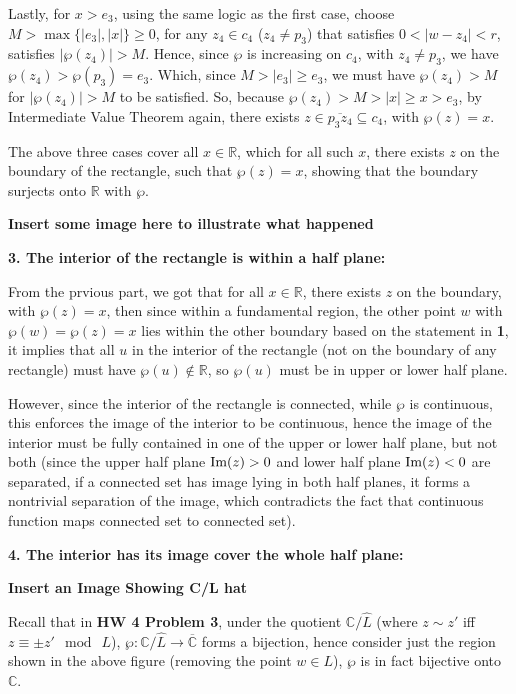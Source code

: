 \documentclass{article}
\begin{document}
\begin{itemize}
    Lastly, for $x>e_3$, using the same logic as the first case, choose $M>\max\{|e_3|,|x|\}\geq 0$, for any $z_4\in c_4$ ($z_4\neq p_3$) that satisfies $0<|w-z_4|<r$, satisfies $|\wp(z_4)|>M$. Hence, since $\wp$ is increasing on $c_4$, with $z_4\neq p_3$, we have $\wp(z_4)>\wp(p_3)=e_3$. Which, since $M>|e_3|\geq e_3$, we must have $\wp(z_4)>M$ for $|\wp(z_4)|>M$ to be satisfied.
    So, because $\wp(z_4)>M>|x|\geq x > e_3$, by Intermediate Value Theorem again, there exists $z\in \overline{p_3z_4}\subseteq c_4$, with $\wp(z)=x$. 

    The above three cases cover all $x\in\mathbb{R}$, which for all such $x$, there exists $z$ on the boundary of the rectangle, such that $\wp(z)=x$, showing that the boundary surjects onto $\mathbb{R}$ with $\wp$.

    \textbf{Insert some image here to illustrate what happened}

    \hfil

    \textbf{3. The interior of the rectangle is within a half plane:}

    From the prvious part, we got that for all $x\in \mathbb{R}$, there exists $z$ on the boundary, with $\wp(z)=x$, then since within a fundamental region, the other point $w$ with $\wp(w)=\wp(z)=x$ lies within the other boundary based on the statement in \textbf{1}, it implies that all $u$ in the interior of the rectangle (not on the boundary of any rectangle) must have $\wp(u)\notin \mathbb{R}$, so $\wp(u)$ must be in upper or lower half plane.

    However, since the interior of the rectangle is connected, while $\wp$ is continuous, this enforces the image of the interior to be continuous, hence the image of the interior must be fully contained in one of the upper or lower half plane, but not both (since the upper half plane $\textmd{Im}(z)>0$ and lower half plane $\textmd{Im}(z)<0$ are separated, if a connected set has image lying in both half planes, it forms a nontrivial separation of the image, which contradicts the fact that continuous function maps connected set to connected set).

    \hfil

    \textbf{4. The interior has its image cover the whole half plane:}

    \textbf{Insert an Image Showing C/L hat}

    Recall that in \textbf{HW 4 Problem 3}, under the quotient $\mathbb{C}/\widehat{L}$ (where $z\sim z'$ iff $z\equiv \pm z'\mod\ L$), $\wp:\mathbb{C}/\widehat{L}\rightarrow\overline{\mathbb{C}}$ forms a bijection, hence consider just the region shown in the above figure (removing the point $w\in L$), $\wp$ is in fact bijective onto $\mathbb{C}$.


\end{itemize}
\end{document}
